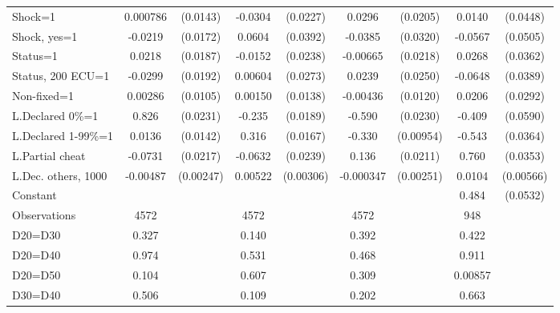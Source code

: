 \begin{tabular}{l|cccccc|cc}
Shock=1         & 0.000786         & (0.0143)&  -0.0304         & (0.0227)&   0.0296         & (0.0205)&   0.0140         & (0.0448)\\
Shock, yes=1    &  -0.0219         & (0.0172)&   0.0604         & (0.0392)&  -0.0385         & (0.0320)&  -0.0567         & (0.0505)\\
Status=1        &   0.0218         & (0.0187)&  -0.0152         & (0.0238)& -0.00665         & (0.0218)&   0.0268         & (0.0362)\\
Status, 200 ECU=1&  -0.0299         & (0.0192)&  0.00604         & (0.0273)&   0.0239         & (0.0250)&  -0.0648\sym{*}  & (0.0389)\\
Non-fixed=1     &  0.00286         & (0.0105)&  0.00150         & (0.0138)& -0.00436         & (0.0120)&   0.0206         & (0.0292)\\
L.Declared 0\%=1&    0.826\sym{***}& (0.0231)&   -0.235\sym{***}& (0.0189)&   -0.590\sym{***}& (0.0230)&   -0.409\sym{***}& (0.0590)\\
L.Declared 1-99\%=1&   0.0136         & (0.0142)&    0.316\sym{***}& (0.0167)&   -0.330\sym{***}&(0.00954)&   -0.543\sym{***}& (0.0364)\\
L.Partial cheat &  -0.0731\sym{***}& (0.0217)&  -0.0632\sym{***}& (0.0239)&    0.136\sym{***}& (0.0211)&    0.760\sym{***}& (0.0353)\\
L.Dec. others, 1000& -0.00487\sym{**} &(0.00247)&  0.00522\sym{*}  &(0.00306)&-0.000347         &(0.00251)&   0.0104\sym{*}  &(0.00566)\\
Constant        &                  &         &                  &         &                  &         &    0.484\sym{***}& (0.0532)\\
\hline
Observations    &     4572         &         &     4572         &         &     4572         &         &      948         &         \\
D20=D30         &    0.327         &         &    0.140         &         &    0.392         &         &    0.422         &         \\
D20=D40         &    0.974         &         &    0.531         &         &    0.468         &         &    0.911         &         \\
D20=D50         &    0.104         &         &    0.607         &         &    0.309         &         &  0.00857         &         \\
D30=D40         &    0.506         &         &    0.109         &         &    0.202         &         &    0.663         &         \\

\end{tabular}
